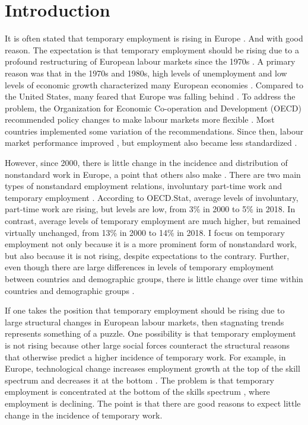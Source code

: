 \documentclass[12pt]{article}
\begin{document}
\clearpage
\section{Introduction}
\doublespacing

It is often stated that temporary employment is rising in Europe \citep{ter_weel_2018,biegert_kuhhirt_2018,hogberg_etal_2019,crouch_2019,reichenberg_berglund_2019}.  And with good reason.  The expectation is that temporary employment should be rising due to a profound restructuring of European labour markets since the 1970s \citep{esping-anderson_regini_2000}.  A primary reason was that in the 1970s and 1980s, high levels of unemployment and low levels of economic growth characterized many European economies \citep{giersch_1985}.  Compared to the United States, many feared that Europe was falling behind \citep{oecd_2003}.  To address the problem, the Organization for Economic Co-operation and Development (OECD) recommended policy changes to make labour markets more flexible \citeyearpar{oecd_1994,oecd_1996}.  Most countries implemented some variation of the recommendations.  Since then, labour market performance improved \citep[pg. 7]{oecd_2006}, but employment also became less standardized \citep{barbieri_2009}.  

However, since 2000, there is little change in the incidence and distribution of nonstandard work in Europe, a point that others also make \citep{bernhardt_2014,pyoria_ojala_2016,lewchuk_2017}.  There are two main types of nonstandard employment relations, involuntary part-time work and temporary employment \citep{kalleberg_2018}.  According to OECD.Stat, average levels of involuntary, part-time work are rising, but levels are low, from 3\% in 2000 to 5\% in 2018.  In contrast, average levels of temporary employment are much higher, but remained virtually unchanged, from 13\% in 2000 to 14\% in 2018.  I focus on temporary employment not only because it is a more prominent form of nonstandard work, but also because it is not rising, despite expectations to the contrary.  Further, even though there are large differences in levels of temporary employment between countries and demographic groups, there is little change over time within countries and demographic groups \citep[ch. 4]{gebel_giesecke_2009,allmendinger_etal_2013,eurofound_2015,oecd_2015}.  

If one takes the position that temporary employment should be rising due to large structural changes in European labour markets, then stagnating trends represents something of a puzzle.  One possibility is that temporary employment is not rising because other large social forces counteract the structural reasons that otherwise predict a higher incidence of temporary work.  For example, in Europe, technological change increases employment growth at the top of the skill spectrum and decreases it at the bottom \citep{oesch_piccitto_2019}.  The problem is that temporary employment is concentrated at the bottom of the skills spectrum \citep{gebel_giesecke_2016}, where employment is declining.  The point is that there are good reasons to expect little change in the incidence of temporary work.
\end{document}
